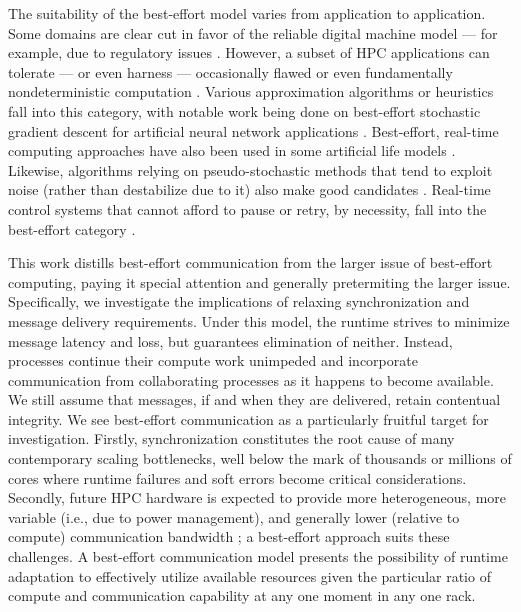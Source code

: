 The suitability of the best-effort model varies from application to application.
Some domains are clear cut in favor of the reliable digital machine model --- for example, due to regulatory issues \citep{dongarra2014applied}.
However, a subset of HPC applications can tolerate --- or even harness --- occasionally flawed or even fundamentally nondeterministic computation \citep{chakradhar2010best}.
Various approximation algorithms or heuristics fall into this category, with notable work being done on best-effort stochastic gradient descent for artificial neural network applications \citep{dean2012large,zhao2019elastic,niu2011hogwild,noel2014dogwild,rhodes2020real}.
Best-effort, real-time computing approaches have also been used in some artificial life models \citep{ray1995proposal}.
Likewise, algorithms relying on pseudo-stochastic methods that tend to exploit noise (rather than destabilize due to it) also make good candidates \citep{chakrapani2008probabilistic,chakradhar2010best}.
Real-time control systems that cannot afford to pause or retry, by necessity, fall into the best-effort category \citep{rahmati2011computing}.

This work distills best-effort communication from the larger issue of best-effort computing, paying it special attention and generally pretermiting the larger issue.
Specifically, we investigate the implications of relaxing synchronization and message delivery requirements.
Under this model, the runtime strives to minimize message latency and loss, but guarantees elimination of neither.
Instead, processes continue their compute work unimpeded and incorporate communication from collaborating processes as it happens to become available.
We still assume that messages, if and when they are delivered, retain contentual integrity.
We see best-effort communication as a particularly fruitful target for investigation.
Firstly, synchronization constitutes the root cause of many contemporary scaling bottlenecks, well below the mark of thousands or millions of cores where runtime failures and soft errors become critical considerations.
Secondly, future HPC hardware is expected to provide more heterogeneous, more variable (i.e., due to power management), and generally lower (relative to compute) communication bandwidth \citep{gropp2013programming, acun2014parallel}; a best-effort approach suits these challenges.
A best-effort communication model presents the possibility of runtime adaptation to effectively utilize available resources given the particular ratio of compute and communication capability at any one moment in any one rack.


